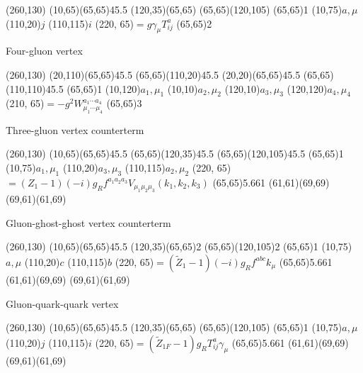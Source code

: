 \begin{axopicture}(260,130) %
	\Gluon(10,65)(65,65){4}{5.5} 
	\Line[arrow](120,35)(65,65)
	\Line[arrow](65,65)(120,105)
	\Vertex(65,65){1}		
	\Text(10,75){$a, \mu$}
	\Text(110,20){$j$}
	\Text(110,115){$i$}
	\Text(220, 65){$=g\gamma_\mu T^a_{ij}$}
	\Vertex(65,65){2}
\end{axopicture}
\newline
Four-gluon vertex

\begin{axopicture}(260,130) %
	\Gluon(20,110)(65,65){4}{5.5}
	\Gluon(65,65)(110,20){4}{5.5}
	\Gluon(20,20)(65,65){4}{5.5}
	\Gluon(65,65)(110,110){4}{5.5}
	\Vertex(65,65){1}		
	\Text(10,120){$a_1,\mu_1$}
	\Text(10,10){$a_2,\mu_2$}
	\Text(120,10){$a_3,\mu_3$}
	\Text(120,120){$a_4,\mu_4$}
	\Text(210, 65){$=-g^2W^{a_1\cdots a_4}_{\mu_1\cdots\mu_4}$}
	\Vertex(65,65){3}
\end{axopicture}
\newline
Three-gluon vertex counterterm

\begin{axopicture}(260,130) %
	\Gluon(10,65)(65,65){4}{5.5} 
	\Gluon(65,65)(120,35){4}{5.5}
	\Gluon(65,65)(120,105){4}{5.5}
	\Vertex(65,65){1}		
	\Text(10,75){$a_1, \mu_1$}
	\Text(110,20){$a_3, \mu_3$}
	\Text(110,115){$a_2, \mu_2$}
	\Text(220, 65){$=(Z_1-1)(-i)g_Rf^{a_1a_2a_3}V_{\mu_1\mu_2\mu_3}(k_1,k_2,k_3)$}
	\GCirc(65,65){5.66}{1}	
	\Line(61,61)(69,69)
	\Line(69,61)(61,69)	 %
\end{axopicture}
\newline
Gluon-ghost-ghost vertex counterterm

\begin{axopicture}(260,130) %
	\Gluon(10,65)(65,65){4}{5.5} 
	\DashLine[arrow](120,35)(65,65){2}
	\DashLine[arrow](65,65)(120,105){2}
	\Vertex(65,65){1}		
	\Text(10,75){$a, \mu$}
	\Text(110,20){$c$}
	\Text(110,115){$b$}
	\Text(220, 65){$=(\widetilde{Z}_1-1)(-i)g_Rf^{abc}k_\mu$}
	\GCirc(65,65){5.66}{1}	
	\Line(61,61)(69,69)
	\Line(69,61)(61,69)	 %
\end{axopicture}
\newline
Gluon-quark-quark vertex

\begin{axopicture}(260,130) %
	\Gluon(10,65)(65,65){4}{5.5} 
	\Line[arrow](120,35)(65,65)
	\Line[arrow](65,65)(120,105)
	\Vertex(65,65){1}		
	\Text(10,75){$a, \mu$}
	\Text(110,20){$j$}
	\Text(110,115){$i$}
	\Text(220, 65){$=(\widetilde{Z}_{1F}-1)g_RT^{a}_{ij}\gamma_\mu$}
	\GCirc(65,65){5.66}{1}	
	\Line(61,61)(69,69)
	\Line(69,61)(61,69)	 %
\end{axopicture}

